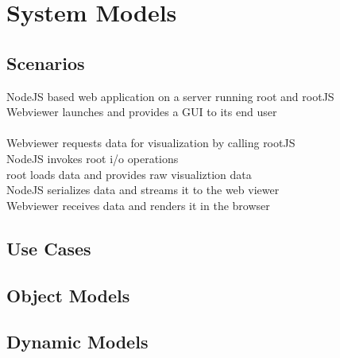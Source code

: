 \chapter{System Models}
\section{Scenarios}
NodeJS based web application on a server running root and rootJS\\
Webviewer launches and provides a GUI to its end user	\\
\\ Webviewer requests data for visualization by calling rootJS\\
\indent	NodeJS invokes root i/o operations\\
\indent \indent		root loads data and provides raw visualiztion data\\
\indent	NodeJS serializes data and streams it to the web viewer\\
Webviewer receives data and renders it in the browser\\
\section{Use Cases}
\section{Object Models}
\section{Dynamic Models}
